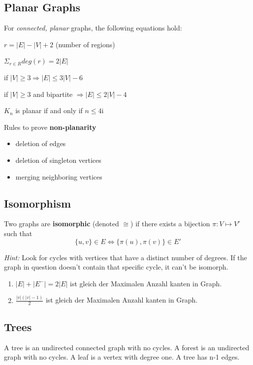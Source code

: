 \documentclass[11pt]{article}
\begin{document}
\subsection{Planar Graphs}

For \emph{connected, planar} graphs, the following equations hold:
\begin{description}[labelindent=16pt,style=multiline,leftmargin=4.5cm, noitemsep]
	\item $r  = |E| - |V| + 2$ (number of regions)
	\item $\Sigma_{r \in R}deg(r) = 2|E|$
	\item if $|V| \geq 3 \Rightarrow |E| \leq 3|V| - 6$
	\item if $|V| \geq 3$ and bipartite $\Rightarrow |E| \leq 2|V| - 4$
	\item $K_n$ is planar if and only if $n \leq 4$i
\end{description}

Rules to prove \textbf{non-planarity}
\begin{itemize}[noitemsep]
	\item deletion of edges
	\item deletion of singleton vertices
	\item merging neighboring vertices
\end{itemize}

\subsection{Isomorphism}

Two graphs are \textbf{isomorphic} (denoted $\cong$) if there exists a bijection $\pi: V \mapsto V'$ such that 
\begin{equation*}
	\{u,v\} \in E \Leftrightarrow \{\pi(u), \pi(v)\} \in E'
\end{equation*}

\emph{Hint:} Look for cycles with vertices that have a distinct number of degrees. If the graph in question doesn't contain that specific cycle, it can't be isomorph. 
\begin{enumerate}
	\item $|E|+|E^{-}| = 2|E|$ ist gleich der Maximalen Anzahl kanten in Graph.
	\item $\frac{|v|(|v|-1)}{2}$ ist gleich der Maximalen Anzahl kanten in Graph.
\end{enumerate}

\subsection{Trees}
A tree is an undirected connected graph with no cycles. A forest is an undirected graph with no cycles. A leaf is a vertex with degree one. A tree has n-1 edges.
\end{document}
